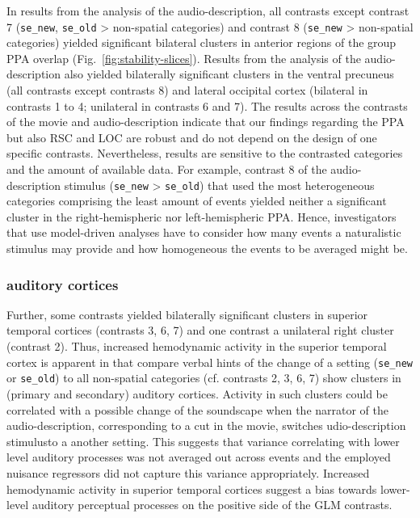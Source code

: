 \documentclass[english]{article}
\begin{document}
In results from the analysis of the audio-description, all contrasts except
contrast 7 (\texttt{se\_new}, \texttt{se\_old} > non-spatial categories) and
contrast 8 (\texttt{se\_new} > non-spatial categories) yielded significant
bilateral clusters in anterior regions of the group PPA overlap
(Fig.~\ref{fig:stability-slices}).
Results from the analysis of the audio-description also yielded bilaterally
significant clusters in the ventral precuneus (all contrasts except contrasts 8)
and lateral occipital cortex (bilateral in contrasts 1 to 4; unilateral in
contrasts 6 and 7).
The results across the contrasts of the movie and audio-description indicate
that our findings regarding the PPA but also RSC and LOC are robust and do not
depend on the design of one specific contrasts.
Nevertheless, results are sensitive to the contrasted categories and the amount
of available data.
For example, contrast 8 of the audio-description stimulus (\texttt{se\_new} >
\texttt{se\_old}) that used the most heterogeneous categories comprising the
least amount of events yielded neither a significant cluster in the
right-hemispheric nor left-hemispheric PPA.
Hence, investigators that use model-driven analyses have to consider how many
events a naturalistic stimulus may provide and how homogeneous the events to be
averaged might be.


\subsubsection{auditory cortices}

Further, some contrasts yielded bilaterally significant clusters in superior
temporal cortices (contrasts 3, 6, 7) and one contrast a unilateral right
cluster (contrast 2).
Thus, increased hemodynamic activity in the superior temporal cortex is apparent
in that compare verbal hints of the change of a setting (\texttt{se\_new} or
\texttt{se\_old}) to all non-spatial categories (cf. contrasts 2, 3, 6, 7) show
clusters in (primary and secondary) auditory cortices.
Activity in such clusters could be correlated with a possible change of the
soundscape when the narrator of the audio-description, corresponding to a cut in
the movie, switches udio-description stimulusto a another setting.
This suggests that variance correlating with lower level auditory processes was
not averaged out across events and the employed nuisance regressors did not
capture this variance appropriately.
Increased hemodynamic activity in superior temporal cortices suggest a bias
towards lower-level auditory perceptual processes on the positive side of the
GLM contrasts.
\end{document}
